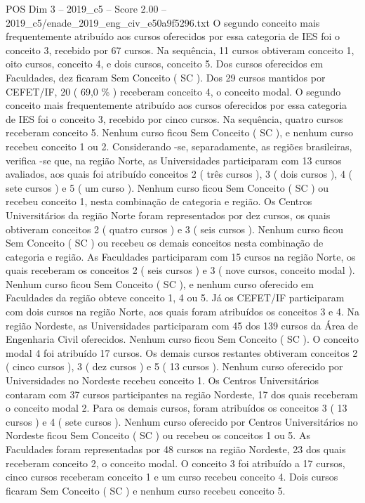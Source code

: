 \begin{textsample}{POS Dim 3 – 2019\_c5 – Score 2.00 – 2019\_c5/enade\_2019\_eng\_civ\_e50a9f5296.txt}
O segundo conceito mais frequentemente atribuído aos cursos oferecidos por essa categoria de IES foi o conceito 3, recebido por 67 cursos.
Na sequência, 11 cursos obtiveram conceito 1, oito cursos, conceito 4, e dois cursos, conceito 5.
Dos cursos oferecidos em Faculdades, dez ficaram Sem Conceito ( SC ).
Dos 29 cursos mantidos por CEFET/IF, 20 ( 69,0 \% ) receberam conceito 4, o conceito modal.
O segundo conceito mais frequentemente atribuído aos cursos oferecidos por essa categoria de IES foi o conceito 3, recebido por cinco cursos.
Na sequência, quatro cursos receberam conceito 5.
Nenhum curso ficou Sem Conceito ( SC ), e nenhum curso recebeu conceito 1 ou 2.
Considerando -se, separadamente, as regiões brasileiras, verifica -se que, na região Norte, as Universidades participaram com 13 cursos avaliados, aos quais foi atribuído conceitos 2 ( três cursos ), 3 ( dois cursos ), 4 ( sete cursos ) e 5 ( um curso ).
Nenhum curso ficou Sem Conceito ( SC ) ou recebeu conceito 1, nesta combinação de categoria e região.
Os Centros Universitários da região Norte foram representados por dez cursos, os quais obtiveram conceitos 2 ( quatro cursos ) e 3 ( seis cursos ).
Nenhum curso ficou Sem Conceito ( SC ) ou recebeu os demais conceitos nesta combinação de categoria e região.
As Faculdades participaram com 15 cursos na região Norte, os quais receberam os conceitos 2 ( seis cursos ) e 3 ( nove cursos, conceito modal ).
Nenhum curso ficou Sem Conceito ( SC ), e nenhum curso oferecido em Faculdades da região obteve conceito 1, 4 ou 5.
Já os CEFET/IF participaram com dois cursos na região Norte, aos quais foram atribuídos os conceitos 3 e 4.
Na região Nordeste, as Universidades participaram com 45 dos 139 cursos da Área de Engenharia Civil oferecidos.
Nenhum curso ficou Sem Conceito ( SC ).
O conceito modal 4 foi atribuído 17 cursos.
Os demais cursos restantes obtiveram conceitos 2 ( cinco cursos ), 3 ( dez cursos ) e 5 ( 13 cursos ).
Nenhum curso oferecido por Universidades no Nordeste recebeu conceito 1.
Os Centros Universitários contaram com 37 cursos participantes na região Nordeste, 17 dos quais receberam o conceito modal 2.
Para os demais cursos, foram atribuídos os conceitos 3 ( 13 cursos ) e 4 ( sete cursos ).
Nenhum curso oferecido por Centros Universitários no Nordeste ficou Sem Conceito ( SC ) ou recebeu os conceitos 1 ou 5.
As Faculdades foram representadas por 48 cursos na região Nordeste, 23 dos quais receberam conceito 2, o conceito modal.
O conceito 3 foi atribuído a 17 cursos, cinco cursos receberam conceito 1 e um curso recebeu conceito 4.
Dois cursos ficaram Sem Conceito ( SC ) e nenhum curso recebeu conceito 5.

\end{textsample}
